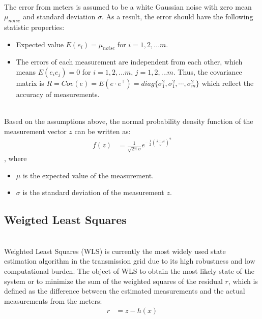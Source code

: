     \\The error from meters is assumed to be a white Gaussian noise with zero mean $\mu_{noise}$ and standard deviation $\sigma$. As a result, the error should have the following statistic properties\cite{gomez2004power}:
    \begin{itemize}
        \item Expected value $E(e_i)=\mu_{noise}$ for $i=1,2,...m$.
        \item The errors of each measurement are independent from each other, which means $E(e_i e_j)=0$ for $i=1,2,...m$, $j=1,2,...m$. Thus, the covariance matrix is $R=Cov(e)=E(e\cdot e^\intercal)=diag \big\{ \sigma_{1}^2, \sigma_{1}^2, \cdots, \sigma_{m}^2\big\}$ which reflect the accuracy of measurements.
    \end{itemize}  
\\Based on the assumptions above, the normal probability density function of the measurement vector $z$ can be written as:
\begin{align}
    f\left(z \right) &= \frac{1}{\sqrt{2\pi}\sigma}e^{-\frac{1}{2}\left(\frac{z-\mu}{\sigma}\right)^2}
    \label{eq:pro_den_fun}
\end{align}
, where
\begin{itemize}
    \item $\mu$ is the expected value of the measurement.
    \item $\sigma$ is the standard deviation of the measurement $z$.

\end{itemize}


\subsection{Weigted Least Squares}
\\Weighted Least Squares (WLS) is currently the most widely used state estimation algorithm in the transmission grid due to its high robustness and low computational burden. The object of WLS to obtain the most likely state of the system or to minimize the sum of the weighted squares of the residual $r$, which is defined as the difference between the estimated measurements and the actual measurements from the meters:
\begin{align}
    r &= z-h(x)
    \label{eq:residual}
\end{align}
